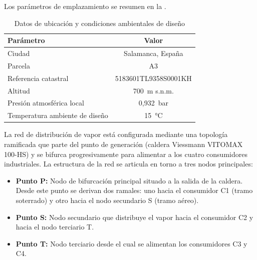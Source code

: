 Los parámetros de emplazamiento se resumen en la .

\begin{table}[H]
	\centering
	\caption{Datos de ubicación y condiciones ambientales de diseño}
	\label{tab:datos-ubicacion}
	\begin{tabular}{lc}
		\toprule
		\textbf{Parámetro}             & \textbf{Valor}       \\
		\midrule
		Ciudad                         & Salamanca, España    \\
		Parcela                        & A3                   \\
		Referencia catastral           & 5183601TL9358S0001KH \\
		Altitud                        & 700~m s.n.m.         \\
		Presión atmosférica local      & 0,932~bar            \\
		Temperatura ambiente de diseño & 15~°C                \\
		\bottomrule
	\end{tabular}
\end{table}

La red de distribución de vapor está configurada mediante una topología ramificada que parte del punto de generación (caldera Viessmann VITOMAX 100-HS) y se bifurca progresivamente para alimentar a los cuatro consumidores industriales. La estructura de la red se articula en torno a tres nodos principales:

\begin{itemize}[leftmargin=2em]
	\item \textbf{Punto P:} Nodo de bifurcación principal situado a la salida de la caldera. Desde este punto se derivan dos ramales: uno hacia el consumidor C1 (tramo soterrado) y otro hacia el nodo secundario S (tramo aéreo).
	\item \textbf{Punto S:} Nodo secundario que distribuye el vapor hacia el consumidor C2 y hacia el nodo terciario T.
	\item \textbf{Punto T:} Nodo terciario desde el cual se alimentan los consumidores C3 y C4.
\end{itemize}

